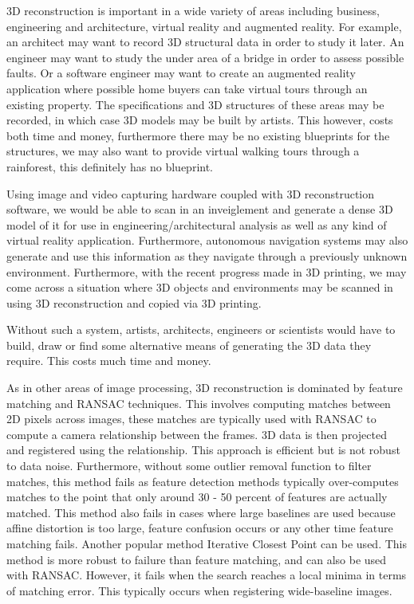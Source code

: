 3D reconstruction is important in a wide variety of areas including business, engineering and architecture, virtual reality and augmented reality. For example, an architect may want to record 3D structural data in order to study it later. An engineer may want to study the under area of a bridge in order to assess possible faults. Or a software engineer may want to create an augmented reality application where possible home buyers can take virtual tours through an existing property. The specifications and 3D structures of these areas may be recorded, in which case 3D models may be built by artists. This however, costs both time and money, furthermore there may be no existing blueprints for the structures, we may also want to provide virtual walking tours through a rainforest, this definitely has no blueprint.

Using image and video capturing hardware coupled with 3D reconstruction software, we would be able to scan in an inveiglement and generate a dense 3D model of it for use in engineering/architectural analysis as well as any kind of virtual reality application. Furthermore, autonomous navigation systems may also generate and use this information as they navigate through a previously unknown environment. Furthermore, with the recent progress made in 3D printing, we may come across a situation where 3D objects and environments may be scanned in using 3D reconstruction and copied via 3D printing.


Without such a system, artists, architects, engineers or scientists would have to build, draw or find some alternative means of generating the 3D data they require. This costs much time and money.

As in other areas of image processing, 3D reconstruction is dominated by feature matching and RANSAC techniques. This involves computing matches between 2D pixels across images, these matches are typically used with RANSAC to compute a camera relationship between the frames. 3D data is then projected and registered using the relationship. This approach is efficient but is not robust to data noise. Furthermore, without some outlier removal function to filter matches, this method fails as feature detection methods typically over-computes matches to the point that only around 30 - 50 percent of features are actually matched. This method also fails in cases where large baselines are used because affine distortion is too large, feature confusion occurs or any other time feature matching fails. Another popular method Iterative Closest Point can be used. This method is more robust to failure than feature matching, and can also be used with RANSAC. However, it fails when the search reaches a local minima in terms of matching error. This typically occurs when registering wide-baseline images.

